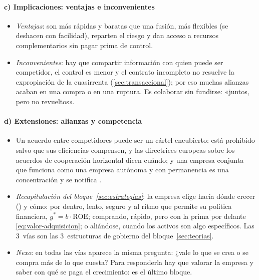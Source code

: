 \documentclass[11pt]{article}
\begin{document}
\paragraph{c) Implicaciones: ventajas e inconvenientes}

\begin{itemize}
\item \emph{Ventajas}: son más rápidas y baratas que una fusión, más flexibles (se deshacen con facilidad), reparten el riesgo y dan acceso a recursos complementarios sin pagar prima de control.
\item \emph{Inconvenientes}: hay que compartir información con quien puede ser competidor, el control es menor y el contrato incompleto no resuelve la expropiación de la cuasirrenta (\ref{sec:transaccional}); por eso muchas alianzas acaban en una compra o en una ruptura. Es colaborar sin fundirse: «juntos, pero no revueltos».
\end{itemize}

\paragraph{d) Extensiones: alianzas y competencia}

\begin{itemize}
\item Un acuerdo entre competidores puede ser un cártel encubierto: está prohibido salvo que sus eficiencias compensen, y las directrices europeas sobre los acuerdos de cooperación horizontal dicen cuándo; y una empresa conjunta que funciona como una empresa autónoma y con permanencia es una concentración y se notifica\nocite{UE2004Reglamento139} .
\end{itemize}

\begin{itemize}
\item \emph{Recapitulación del bloque~\ref{sec:estrategias}}: la empresa elige hacia dónde crecer () y cómo: por dentro, lento, seguro y al ritmo que permite su política financiera, $g^{*}=b\cdot\mathrm{ROE}$; comprando, rápido, pero con la prima por delante \eqref{eq:valor-adquisicion}; o aliándose, cuando los activos son algo específicos. Las 3~vías son las 3~estructuras de gobierno del bloque~\ref{sec:teorias}.
\item \emph{Nexo}: en todas las vías aparece la misma pregunta: ¿vale lo que se crea o se compra más de lo que cuesta? Para responderla hay que valorar la empresa y saber con qué se paga el crecimiento: es el último bloque.
\end{itemize}
\end{document}
